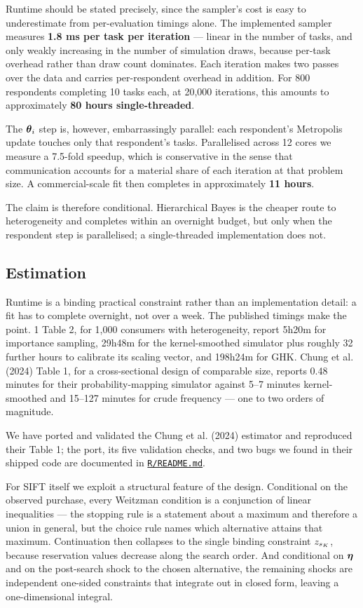 \documentclass[
  letterpaper,
  DIV=11,
  numbers=noendperiod]{scrartcl}
\begin{document}
Runtime should be stated precisely, since the sampler's cost is easy to
underestimate from per-evaluation timings alone. The implemented sampler
measures \textbf{1.8 ms per task per iteration} --- linear in the number
of tasks, and only weakly increasing in the number of simulation draws,
because per-task overhead rather than draw count dominates. Each
iteration makes two passes over the data and carries per-respondent
overhead in addition. For 800 respondents completing 10 tasks each, at
20,000 iterations, this amounts to approximately \textbf{80 hours
single-threaded}.

The \(\boldsymbol{\theta}_i\) step is, however, embarrassingly parallel: each
respondent's Metropolis update touches only that respondent's tasks.
Parallelised across 12 cores we measure a 7.5-fold speedup, which is
conservative in the sense that communication accounts for a material
share of each iteration at that problem size. A commercial-scale fit
then completes in approximately \textbf{11 hours}.

The claim is therefore conditional. Hierarchical Bayes is the cheaper
route to heterogeneity and completes within an overnight budget, but
only when the respondent step is parallelised; a single-threaded
implementation does not.

\subsection{Estimation}\label{sec-est-estimation}

Runtime is a binding practical constraint rather than an implementation
detail: a fit has to complete overnight, not over a week. The published
timings make the point. 1 Table 2, for 1,000 consumers with
heterogeneity, report 5h20m for importance sampling, 29h48m for the
kernel-smoothed simulator plus roughly 32 further hours to calibrate its
scaling vector, and 198h24m for GHK. Chung et al. (2024) Table 1, for a
cross-sectional design of comparable size, reports 0.48 minutes for
their probability-mapping simulator against 5--7 minutes kernel-smoothed
and 15--127 minutes for crude frequency --- one to two orders of
magnitude.

We have ported and validated the Chung et al. (2024) estimator and
reproduced their Table 1; the port, its five validation checks, and two
bugs we found in their shipped code are documented in
\href{../R/README.md}{\texttt{R/README.md}}.

For SIFT itself we exploit a structural feature of the design.
Conditional on the observed purchase, every Weitzman condition is a
conjunction of linear inequalities --- the stopping rule is a statement
about a maximum and therefore a union in general, but the choice rule
names which alternative attains that maximum. Continuation then
collapses to the single binding constraint \(z_{s_K}\), because
reservation values decrease along the search order. And conditional on
\(\boldsymbol{\eta}\) and on the post-search shock to the chosen alternative, the
remaining shocks are independent one-sided constraints that integrate
out in closed form, leaving a one-dimensional integral.
\end{document}
